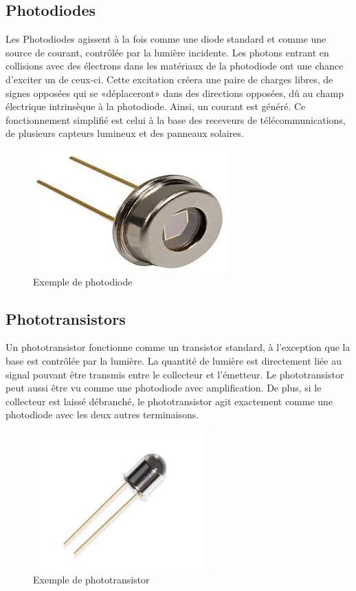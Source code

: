 \documentclass[12pt,oneside,letterpaper]{article}
\begin{document}
\subsection{Photodiodes}
Les Photodiodes agissent à la fois comme une diode standard et comme une source de courant, contrôlée par la lumière incidente. Les photons entrant en collisions avec des électrons dans les matériaux de la photodiode ont une chance d'exciter un de ceux-ci. Cette excitation créera une paire de charges libres, de signes opposées qui se «déplaceront» dans des directions opposées, dû au champ électrique intrinsèque à la photodiode. Ainsi, un courant est généré. Ce fonctionnement simplifié est celui à la base des receveurs de télécommunications, de plusieurs capteurs lumineux et des panneaux solaires.
\begin{figure}[h]
    \centering
    \includegraphics[scale=0.4]{Labos-Complements/Lab09/LabDD/Figures/photodiode.jpg}
    \caption{Exemple de photodiode}
    \label{fig:enter-label}
\end{figure}

\subsection{Phototransistors}

Un phototransistor fonctionne comme un transistor standard, à l'exception que la base est contrôlée par la lumière. La quantité de lumière est directement liée au signal pouvant être transmis entre le collecteur et l'émetteur. Le phototransistor peut aussi être vu comme une photodiode avec amplification. De plus, si le collecteur est laissé débranché, le phototransistor agit exactement comme une photodiode avec les deux autres terminaisons.

\begin{figure}[h]
    \centering
    \includegraphics[scale = 0.6]{Labos-Complements/Lab09/LabDD/Figures/phototransistor.jpg}
    \caption{Exemple de phototransistor}
    \label{fig:enter-label}
\end{figure}
\newpage
\end{document}
